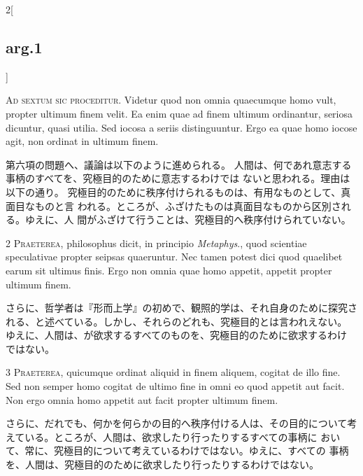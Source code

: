 \documentclass[paper=a4paper,fontsize=10pt,jafontsize=9pt,titlepage]{jlreq}
\begin{document}
\begin{paracol}{2}[\subsection{arg.1}]

{\Huge A}{\scshape d sextum sic proceditur}. Videtur quod
non omnia quaecumque homo vult, propter ultimum finem velit. Ea enim
quae ad finem ultimum ordinantur, seriosa dicuntur, quasi utilia. Sed
iocosa a seriis distinguuntur. Ergo ea quae homo iocose agit, non
ordinat in ultimum finem.

\switchcolumn

第六項の問題へ、議論は以下のように進められる。
人間は、何であれ意志する事柄のすべてを、究極目的のために意志するわけでは
 ないと思われる。理由は以下の通り。
究極目的のために秩序付けられるものは、有用なものとして、真面目なものと言
 われる。ところが、ふざけたものは真面目なものから区別される。ゆえに、人
 間がふざけて行うことは、究極目的へ秩序付けられていない。


{\scshape 2 Praeterea}, philosophus dicit, in
principio {\itshape Metaphys}., quod scientiae speculativae propter seipsas
quaeruntur. Nec tamen potest dici quod quaelibet earum sit ultimus
finis. Ergo non omnia quae homo appetit, appetit propter ultimum finem.

\switchcolumn

さらに、哲学者は『形而上学』の初めで、観照的学は、それ自身のために探究さ
 れる、と述べている。しかし、それらのどれも、究極目的とは言われえない。
 ゆえに、人間は、が欲求するすべてのものを、究極目的のために欲求するわけ
 ではない。


{\scshape 3 Praeterea}, quicumque ordinat aliquid in
finem aliquem, cogitat de illo fine. Sed non semper homo cogitat de
ultimo fine in omni eo quod appetit aut facit. Non ergo omnia homo
appetit aut facit propter ultimum finem.

\switchcolumn

さらに、だれでも、何かを何らかの目的へ秩序付ける人は、その目的について考
 えている。ところが、人間は、欲求したり行ったりするすべての事柄に
 おいて、常に、究極目的について考えているわけではない。ゆえに、すべての
 事柄を、人間は、究極目的のために欲求したり行ったりするわけではない。


\end{paracol}
\end{document}
